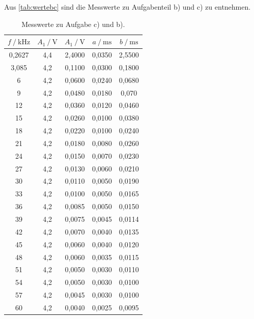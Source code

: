 Aus \autoref{tab:wertebc} sind die Messwerte zu Aufgabenteil b) und c) zu entnehmen.
\begin{table}[H]
    \centering
    \caption{Messwerte zu Aufgabe c) und b).}
    \label{tab:wertebc}
    \begin{tabular}{c c c c c}
        \toprule
        $f \:/\:\si{\kilo\hertz}$ & $A_1 \:/\: \si{\volt}$ & $A_1 \:/\: \si{\volt}$ & $a \:/\: \si{\milli\second}$ & $b \:/\: \si{\milli\second}$ \\
        \midrule
        0,2627 & 4,4 & 2,4000 & 0,0350 & 2,5500 \\
        3,085 & 4,2 & 0,1100 & 0,0300 & 0,1800 \\
        6 & 4,2 & 0,0600 & 0,0240 & 0,0680 \\
        9 & 4,2 & 0,0480 & 0,0180 & 0,070 \\
        12 & 4,2 & 0,0360 & 0,0120 & 0,0460 \\
        15 & 4,2 & 0,0260 & 0,0100 & 0,0380 \\
        18 & 4,2 & 0,0220 & 0,0100 & 0,0240 \\
        21 & 4,2 & 0,0180 & 0,0080 & 0,0260 \\
        24 & 4,2 & 0,0150 & 0,0070 & 0,0230 \\
        27 & 4,2 & 0,0130 & 0,0060 & 0,0210 \\
        30 & 4,2 & 0,0110 & 0,0050 & 0,0190 \\
        33 & 4,2 & 0,0100 & 0,0050 & 0,0165 \\
        36 & 4,2 & 0,0085 & 0,0050 & 0,0150 \\
        39 & 4,2 & 0,0075 & 0,0045 & 0,0114 \\
        42 & 4,2 & 0,0070 & 0,0040 & 0,0135 \\
        45 & 4,2 & 0,0060 & 0,0040 & 0,0120 \\
        48 & 4,2 & 0,0060 & 0,0035 & 0,0115 \\
        51 & 4,2 & 0,0050 & 0,0030 & 0,0110 \\
        54 & 4,2 & 0,0050 & 0,0030 & 0,0100 \\
        57 & 4,2 & 0,0045 & 0,0030 & 0,0100 \\
        60 & 4,2 & 0,0040 & 0,0025 & 0,0095 \\
        \bottomrule
    \end{tabular}
\end{table}


